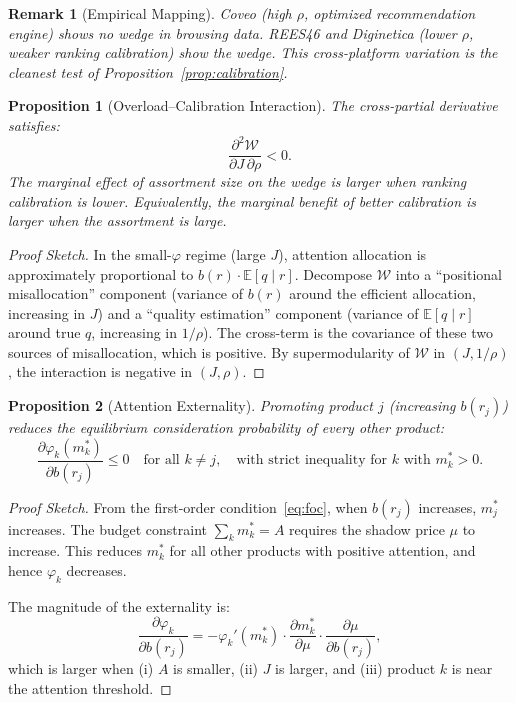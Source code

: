 \documentclass[12pt]{article}
\newtheorem{proposition}{Proposition}
\newtheorem{remark}{Remark}
\begin{document}
\begin{remark}[Empirical Mapping]
Coveo (high $\rho$, optimized recommendation engine) shows no wedge in browsing data. REES46 and Diginetica (lower $\rho$, weaker ranking calibration) show the wedge. This cross-platform variation is the cleanest test of Proposition~\ref{prop:calibration}.
\end{remark}

\begin{proposition}[Overload--Calibration Interaction]\label{prop:interaction}
The cross-partial derivative satisfies:
\begin{equation}
    \frac{\partial^2 \mathcal{W}}{\partial J \,\partial \rho} < 0.
\end{equation}
The marginal effect of assortment size on the wedge is larger when ranking calibration is lower. Equivalently, the marginal benefit of better calibration is larger when the assortment is large.
\end{proposition}

\begin{proof}[Proof Sketch]
In the small-$\varphi$ regime (large $J$), attention allocation is approximately proportional to $b(r) \cdot \mathbb{E}[q \mid r]$. Decompose $\mathcal{W}$ into a ``positional misallocation'' component (variance of $b(r)$ around the efficient allocation, increasing in $J$) and a ``quality estimation'' component (variance of $\mathbb{E}[q \mid r]$ around true $q$, increasing in $1/\rho$). The cross-term is the covariance of these two sources of misallocation, which is positive. By supermodularity of $\mathcal{W}$ in $(J, 1/\rho)$, the interaction is negative in $(J, \rho)$.
\end{proof}

\begin{proposition}[Attention Externality]\label{prop:externality}
Promoting product $j$ (increasing $b(r_j)$) reduces the equilibrium consideration probability of every other product:
\begin{equation}
    \frac{\partial \varphi_k(m_k^*)}{\partial b(r_j)} \leq 0 \quad \text{for all } k \neq j, \quad \text{with strict inequality for } k \text{ with } m_k^* > 0.
\end{equation}
\end{proposition}

\begin{proof}[Proof Sketch]
From the first-order condition~\eqref{eq:foc}, when $b(r_j)$ increases, $m_j^*$ increases. The budget constraint $\sum_k m_k^* = A$ requires the shadow price $\mu$ to increase. This reduces $m_k^*$ for all other products with positive attention, and hence $\varphi_k$ decreases.

The magnitude of the externality is:
\[
    \frac{\partial \varphi_k}{\partial b(r_j)} = -\varphi_k'(m_k^*) \cdot \frac{\partial m_k^*}{\partial \mu} \cdot \frac{\partial \mu}{\partial b(r_j)},
\]
which is larger when (i) $A$ is smaller, (ii) $J$ is larger, and (iii) product $k$ is near the attention threshold.
\end{proof}
\end{document}
